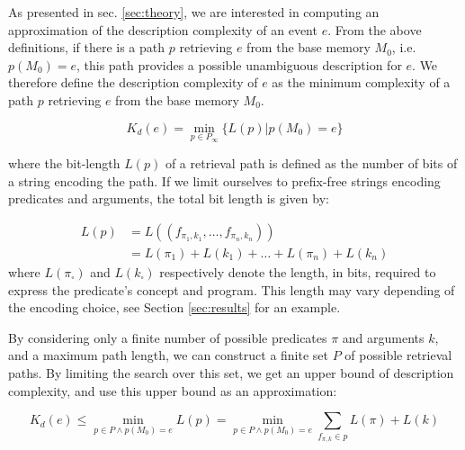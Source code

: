 \documentclass[entropy,article,submit,moreauthors,pdftex]{Definitions/mdpi}
\begin{document}
As presented in sec. \ref{sec:theory}, we are interested in computing an approximation of the description complexity of an event $e$. From the above definitions, if there is a path $p$ retrieving $e$ from the base memory $M_0$, i.e. $p(M_0) = e$, this path provides a possible unambiguous description for $e$. We therefore define the description complexity of $e$ as the minimum complexity of a path $p$ retrieving $e$ from the base memory $M_0$.

\begin{equation}
    \label{eq:k_desc}
    K_d(e) = \min_{p \in P_\infty} \{L(p) | p(M_0) = e\}
\end{equation}

where the bit-length $L(p)$ of a retrieval path is defined as the number of bits of a string encoding the path. If we limit ourselves to prefix-free strings encoding predicates and arguments, the total bit length is given by:

\begin{align}
    \label{eq:bit_lenght_p}
    L(p) & = L((f_{\pi_1,k_1}, \dots, f_{\pi_n, k_n}))     \\
         & = L(\pi_1) + L(k_1) + \dots + L(\pi_n) + L(k_n)
\end{align}
where $L(\pi_\square)$ and $L(k_\square)$ respectively denote the length, in bits, required to express the predicate's concept and program. This length may vary depending of the encoding choice, see Section \ref{sec:results} for an example.

By considering only a finite number of possible predicates $\pi$ and arguments $k$, and a maximum path length, we can construct a finite set $P$ of possible retrieval paths. By limiting the search over this set, we get an upper bound of description complexity, and use this upper bound as an approximation:

\begin{equation}
    \label{eq:approx_k_desc}
    K_d(e) \leq \min_{p \in P \land p(M_0) = e} L(p) = \min_{p \in P \land p(M_0)=e} \sum_{f_{\pi, k} \in p} L(\pi) + L(k)
\end{equation}
\end{document}
